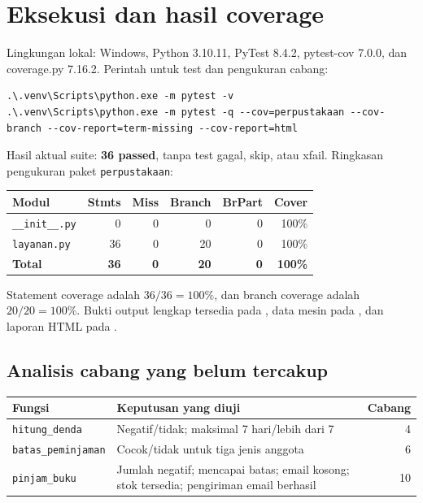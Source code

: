 \documentclass[11pt,a4paper]{article}
\begin{document}
\section{Eksekusi dan hasil coverage}
Lingkungan lokal: Windows, Python 3.10.11, PyTest 8.4.2, pytest-cov 7.0.0,
dan coverage.py 7.16.2. Perintah untuk test dan pengukuran cabang:
\begin{lstlisting}
.\.venv\Scripts\python.exe -m pytest -v
.\.venv\Scripts\python.exe -m pytest -q --cov=perpustakaan --cov-branch --cov-report=term-missing --cov-report=html
\end{lstlisting}
Hasil aktual suite: \textbf{36 passed}, tanpa test gagal, skip, atau xfail.
Ringkasan pengukuran paket \texttt{perpustakaan}:
\begin{center}
\begin{tabular}{@{}lrrrrr@{}}
\toprule
\rowcolor{lightblue}\textbf{Modul} & \textbf{Stmts} & \textbf{Miss} & \textbf{Branch} & \textbf{BrPart} & \textbf{Cover}\\
\midrule
\texttt{\_\_init\_\_.py} & 0 & 0 & 0 & 0 & 100\%\\
\texttt{layanan.py} & 36 & 0 & 20 & 0 & 100\%\\
\midrule
\textbf{Total} & \textbf{36} & \textbf{0} & \textbf{20} & \textbf{0} & \textbf{100\%}\\
\bottomrule
\end{tabular}
\end{center}
Statement coverage adalah $36/36=100\%$, dan branch coverage adalah
$20/20=100\%$. Bukti output lengkap tersedia pada ,
data mesin pada , dan laporan HTML pada
.

\subsection{Analisis cabang yang belum tercakup}
\begin{tabularx}{\linewidth}{@{}p{3.9cm}Yr@{}}
\toprule
{}\textbf{Fungsi} & \textbf{Keputusan yang diuji} & \textbf{Cabang}\\
\midrule
\texttt{hitung\_denda} & Negatif/tidak; maksimal 7 hari/lebih dari 7 & 4\\
\texttt{batas\_peminjaman} & Cocok/tidak untuk tiga jenis anggota & 6\\
\texttt{pinjam\_buku} & Jumlah negatif; mencapai batas; email kosong; stok tersedia; pengiriman email berhasil & 10\\
\bottomrule
\end{tabularx}
\end{document}
